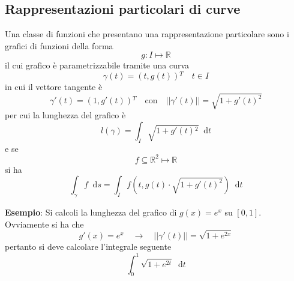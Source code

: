 \documentclass[a4paper]{extarticle}
\newcommand*\dif{\mathop{}\!\mathrm{d}}
\begin{document}
\vspace{1em}
\subsection{Rappresentazioni particolari di curve}
Una classe di funzioni che presentano una rappresentazione particolare sono
i grafici di funzioni della forma
\[g : I \longmapsto \mathbb{R}\]
il cui grafico è parametrizzabile tramite una curva
\[\gamma(t) = (t,g(t)){^T} \hspace{1em} t \in I\]
in cui il vettore tangente è
\[\gamma'(t) = (1,g'(t)){^T} \hspace{1em} \text{con} \hspace{1em} \vert\vert \gamma'(t) \vert\vert=\sqrt{1+g'(t)^2}\]
per cui la lunghezza del grafico è
\[l(\gamma) = \int_I \sqrt{1+g'(t){^2}} \dif t\]
e se
\[f \subseteq \mathbb{R}^2 \longmapsto \mathbb{R}\]
si ha
\[\int_\gamma f \dif s = \int_I f(t,g(t) \cdot \sqrt{1+g'(t)^2}) \dif t\]

\vspace{1em}
\noindent
\textbf{Esempio}: Si calcoli la lunghezza del grafico di $g(x)=e^x$ su $[0,1]$. Ovviamente si ha che
\[g'(x)=e^x \hspace{1em} \rightarrow \hspace{1em} \vert\vert \gamma'(t) \vert\vert = \sqrt{1+e^{2x}}\]
pertanto si deve calcolare l'integrale seguente
\[\int_0^1 \sqrt{1+e^{2t}} \dif t\]
\end{document}
